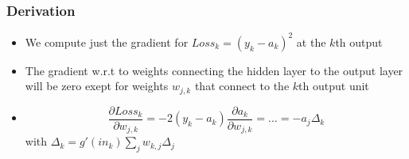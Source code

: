 \documentclass{scrartcl}
\begin{document}
\subsubsection{Derivation}
\begin{itemize}
    \item
        We compute just the gradient for \(Loss_k = (y_k - a_k)^2\) at the \(k\)th output 
    \item
        The gradient w.r.t to weights connecting the hidden layer to the output layer will be zero exept for weights \(w_{j,k}\) that connect to the \(k\)th output unit
    \item
        \[\frac{\partial Loss_k}{\partial w_{j,k}} = -2(y_k -a_k) \frac{\partial a_k}{\partial w_{j,k}} = \dots = -a_j \Delta_k\]
        with \(\Delta_k = g'(in_k) \sum_j w_{k,j} \Delta_j\)
\end{itemize}
\end{document}
